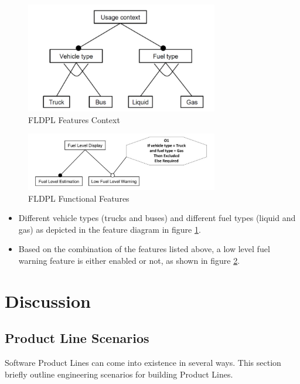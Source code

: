 \documentclass[11pt]{article}
\begin{document}
 \begin{figure}
  \centering
  \includegraphics[width=0.75\textwidth]{FLDPLContext}
  \caption{FLDPL Features Context}
  \label{fig:FLDPLContext}
\end{figure}

 \begin{figure}
  \centering
  \includegraphics[width=0.75\textwidth]{FLDPLFeatures}
  \caption{FLDPL Functional Features}
  \label{fig:FLDPLFeatures}
\end{figure}

 \begin{itemize}
 
 \item Different vehicle types (trucks and buses) and different fuel types (liquid and gas) as depicted in the feature diagram in figure \ref{fig:FLDPLContext}.
 \item Based on the combination of the features listed above, a low level fuel warning feature is either enabled or not, as shown in figure \ref{fig:FLDPLFeatures}.
 
 \end{itemize}
 
\section{Discussion}

\subsection{Product Line Scenarios}

Software Product Lines can come into existence in several ways. This section briefly outline engineering scenarios for building Product Lines.
\end{document}
